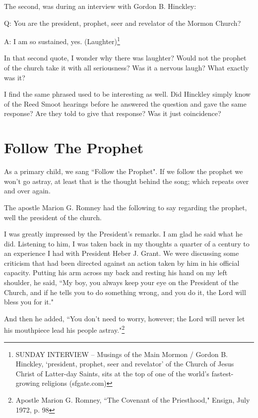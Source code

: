 The second, was during an interview with Gordon B. Hinckley:

\begin{displayquote}
Q: You are the president, prophet, seer and revelator of the Mormon Church?

A: I am so sustained, yes. (Laughter)\footnote{SUNDAY INTERVIEW -- Musings of the 
Main Mormon / Gordon B. Hinckley, `president, prophet, seer and revelator' of the 
Church of Jesus Christ of Latter-day Saints, sits at the top of one of the world's 
fastest-growing religions (sfgate.com) }
\end{displayquote}

In that second quote, I wonder why there was laughter? Would not the prophet of the
church take it with all seriousness? Was it a nervous laugh? What exactly was it?

I find the same phrased used to be interesting as well. Did Hinckley simply know of
the Reed Smoot hearings before he answered the question and gave the same response?
Are they told to give that response? Was it just coincidence?

\section{Follow The Prophet}

As a primary child, we sang ``Follow the Prophet". If we follow the prophet we won't
go astray, at least that is the thought behind the song; which repeats over and over
again.

The apostle Marion G. Romney had the following to say regarding the prophet, well the
president of the church.

\begin{displayquote}
I was greatly impressed by the President's remarks. I am glad he said what he did. 
Listening to him, I was taken back in my thoughts a quarter of a century to an 
experience I had with President Heber J. Grant. We were discussing some criticism 
that had been directed against an action taken by him in his official capacity. 
Putting his arm across my back and resting his hand on my left shoulder, he said, 
``My boy, you always keep your eye on the President of the Church, and if he tells 
you to do something wrong, and you do it, the Lord will bless you for it."

And then he added, ``You don't need to worry, however; the Lord will never let his
mouthpiece lead his people astray."\footnote{Apostle Marion G. Romney, 
``The Covenant of the Priesthood," Ensign, July 1972, p. 98}
\end{displayquote}